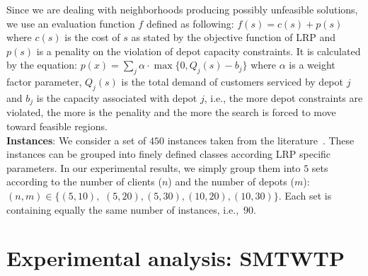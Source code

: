 \documentclass{acm_proc_article-sp}
\begin{document}
Since we are dealing with neighborhoods producing possibly unfeasible solutions, we use an evaluation function $f$ defined as following: $f(s)=c(s)+p(s)$ where $c(s)$ is the cost of $s$ as stated by the objective function of LRP and $p(s)$ is a penality on the violation of depot capacity constraints. It is calculated by the equation: $p(x) = \sum_{j}  \alpha \cdot \max\{0, Q_j (s) - b_j \}$ where $\alpha$ is a weight factor parameter, $Q_j (s)$ is the total demand of customers serviced by depot $j$ and $b_j$ is the capacity associated with depot $j$, i.e., the more depot constraints are violated, the more is the penality and the more the search is forced to move toward feasible regions.\\
\textbf{Instances}: We consider a set of $450$ instances taken from the literature~\cite{ulrp}. These instances can be grouped into finely defined classes according LRP specific parameters. In our experimental results, we simply group them into $5$ sets according to the number of clients ($n$) and the number of depots ($m$): $(n,m) \in \{(5,10),$ $(5,20), (5,30), (10,20), (10,30)\}$. Each set is containing equally the same number of instances, i.e.,~$90$.


\section{Experimental analysis: SMTWTP}\label{sec:smtwtp}
\end{document}
